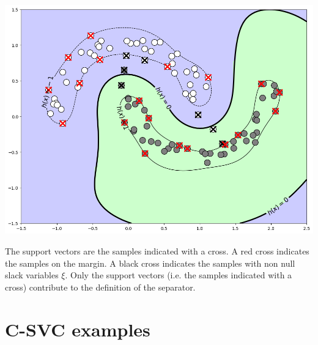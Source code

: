 \documentclass{article}
\begin{document}
\begin{multicols*}{3}
				\includegraphics[width=\columnwidth]{csvc001.png}

				The support vectors are the samples indicated with a cross. A red cross indicates the samples on the margin. A black cross indicates the samples with non null slack variables $\xi$. Only the support vectors (i.e. the samples indicated with a cross) contribute to the definition of the separator.
			
\section*{C-SVC examples}


		\end{multicols*}
		
\end{document}
